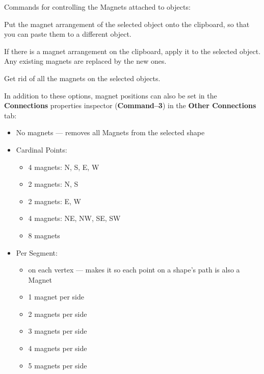 \documentclass[../main.tex]{subfiles}
\begin{document}
\begin{description}[style=nextline]
  \item[{Magnets}] Commands for controlling the Magnets attached to objects:

    \begin{description}[style=nextline]
      \item[{Copy Magnets}] Put the magnet arrangement of the selected object onto the clipboard,
        so that you can paste them to a different object.
      \item[{Paste Magnets}] If there is a magnet arrangement on the clipboard, apply it to the
        selected object. Any existing magnets are replaced by the new ones.
      \item[{Delete Magnets}] Get rid of all the magnets on the selected objects.
      \item[{Positions}] In addition to these options, magnet positions can also be set in the
        \textbf{Connections} properties inspector (\textbf{Command--3}) in the \textbf{Other
        Connections} tab:
    \end{description}

    \begin{itemize}
      \item No magnets --- removes all Magnets from the selected shape
      \item Cardinal Points:

        \begin{itemize}
          \item 4 magnets: N, S, E, W
          \item 2 magnets: N, S
          \item 2 magnets: E, W
          \item 4 magnets: NE, NW, SE, SW
          \item 8 magnets
        \end{itemize}
      \item Per Segment:

        \begin{itemize}
          \item on each vertex --- makes it so each point on a shape's path is also a Magnet
          \item 1 magnet per side
          \item 2 magnets per side
          \item 3 magnets per side
          \item 4 magnets per side
          \item 5 magnets per side
        \end{itemize}
    \end{itemize}
\end{description}
\end{document}
